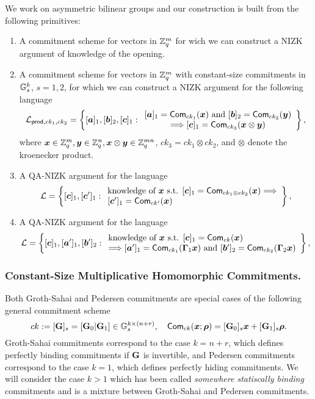 We work on asymmetric bilinear groups and our construction is built from the following primitives:
\begin{enumerate}
\item A commitment scheme for vectors in $\mathbb{Z}_q^m$ for wich we can construct a NIZK argument of knowledge of the opening.
\item A commitment scheme for vectors in $\mathbb{Z}_q^m$ with constant-size commitments in $\mathbb{G}_s^k$, $s=1,2$, for which we can construct a NIZK argument for the following language
$$
\mathcal{L}_{\mathsf{prod},ck_1,ck_2}=\left\{[{\boldsymbol{a}}]_1,[{\boldsymbol{b}}]_2,[{\boldsymbol{c}}]_1:
	\begin{array}{c}
		[{\boldsymbol{a}}]_1=\mathsf{Com}_{ck_1}({\boldsymbol{x}})\text{ and }
		[{\boldsymbol{b}}]_2=\mathsf{Com}_{ck_2}({\boldsymbol{y}})\\
		\Longrightarrow
		[{\boldsymbol{c}}]_1=\mathsf{Com}_{ck_3}({\boldsymbol{x}}\otimes{\boldsymbol{y}})
	\end{array}\right\},
$$
where ${\boldsymbol{x}}\in\mathbb{Z}_q^m,{\boldsymbol{y}}\in\mathbb{Z}_q^n,{\boldsymbol{x}}\otimes{\boldsymbol{y}}\in\mathbb{Z}_q^{mn}$, $ck_3=ck_1\otimes ck_2$, and $\otimes$ denote the kroenecker product.
\item A QA-NIZK argument for the language
$$
\mathcal{L} = \left\{[{\boldsymbol{c}}]_1,[{\boldsymbol{c}}']_1:
	\begin{array}{l} \text{knowledge of } {\boldsymbol{x}} \text{ s.t. }
		{[{\boldsymbol{c}}]_1=\mathsf{Com}_{ck_1\otimes ck_2}({\boldsymbol{x}})}
		\Longrightarrow\\
		{[{\boldsymbol{c}}']_1=\mathsf{Com}_{ck'}({\boldsymbol{x}})}
	\end{array}\right\},
$$
\item A QA-NIZK argument for the language
$$
\mathcal{L} = \left\{[{\boldsymbol{c}}]_1,[{\boldsymbol{a}}']_1,[{\boldsymbol{b}}']_2:
	\begin{array}{l}
		\text{knowledge of } {\boldsymbol{x}} \text{ s.t. }[{\boldsymbol{c}}]_1=\mathsf{Com}_{ck}({\boldsymbol{x}})\\
		\Longrightarrow
		[{\boldsymbol{a}}']_1=\mathsf{Com}_{ck_1}(\mathbf{{\Gamma}}_1{\boldsymbol{x}})\text{ and }
		[{\boldsymbol{b}}']_2=\mathsf{Com}_{ck_2}(\mathbf{{\Gamma}}_2{\boldsymbol{x}})
	\end{array}\right\},
$$
\end{enumerate}

\subsubsection{Constant-Size  Multiplicative Homomorphic Commitments.}
Both Groth-Sahai and Pedersen commitments are special cases of the following general commitment scheme
$$
ck:=[\mathbf{{G}}]_s=[\mathbf{{G}}_0|\mathbf{{G}}_1]\in\mathbb{G}_s^{k\times (n+r)}, \quad \mathsf{Com}_{ck}({\boldsymbol{x}};{\boldsymbol{\rho}})=[\mathbf{{G}}_0]_s{\boldsymbol{x}}+[\mathbf{{G}}_1]_s{\boldsymbol{\rho}}.
$$
Groth-Sahai commitments correspond to the case $k=n+r$, which defines perfectly binding commitments if $\mathbf{{G}}$ is invertible, and Pedersen commitments correspond to the case $k=1$, which defines perfectly hiding commitments. We will consider the case $k>1$ which has been called \emph{somewhere statiscally binding} commitments and is a mixture between Groth-Sahai and Pedersen commitments.

